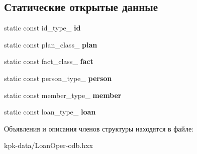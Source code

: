 \subsection*{Статические открытые данные}
\begin{DoxyCompactItemize}
\item 
static const id\+\_\+type\+\_\+ {\bfseries id}\hypertarget{structodb_1_1pointer__query__columns_3_01_1_1kpk_1_1data_1_1_loan_oper_00_01id__pgsql_00_01_a_01_4_a14b2b11bce62adbfae81bbcb9eeeebc2}{}\label{structodb_1_1pointer__query__columns_3_01_1_1kpk_1_1data_1_1_loan_oper_00_01id__pgsql_00_01_a_01_4_a14b2b11bce62adbfae81bbcb9eeeebc2}

\item 
static const plan\+\_\+class\+\_\+ {\bfseries plan}\hypertarget{structodb_1_1pointer__query__columns_3_01_1_1kpk_1_1data_1_1_loan_oper_00_01id__pgsql_00_01_a_01_4_aa7c6cc66c1d8107f30520b266862c297}{}\label{structodb_1_1pointer__query__columns_3_01_1_1kpk_1_1data_1_1_loan_oper_00_01id__pgsql_00_01_a_01_4_aa7c6cc66c1d8107f30520b266862c297}

\item 
static const fact\+\_\+class\+\_\+ {\bfseries fact}\hypertarget{structodb_1_1pointer__query__columns_3_01_1_1kpk_1_1data_1_1_loan_oper_00_01id__pgsql_00_01_a_01_4_a1460627519acc9d1bf23ae6a7fd053e9}{}\label{structodb_1_1pointer__query__columns_3_01_1_1kpk_1_1data_1_1_loan_oper_00_01id__pgsql_00_01_a_01_4_a1460627519acc9d1bf23ae6a7fd053e9}

\item 
static const person\+\_\+type\+\_\+ {\bfseries person}\hypertarget{structodb_1_1pointer__query__columns_3_01_1_1kpk_1_1data_1_1_loan_oper_00_01id__pgsql_00_01_a_01_4_addf9399b85c9c642d928952a74c047b0}{}\label{structodb_1_1pointer__query__columns_3_01_1_1kpk_1_1data_1_1_loan_oper_00_01id__pgsql_00_01_a_01_4_addf9399b85c9c642d928952a74c047b0}

\item 
static const member\+\_\+type\+\_\+ {\bfseries member}\hypertarget{structodb_1_1pointer__query__columns_3_01_1_1kpk_1_1data_1_1_loan_oper_00_01id__pgsql_00_01_a_01_4_a4e73ca1d947e104a4528577419c44777}{}\label{structodb_1_1pointer__query__columns_3_01_1_1kpk_1_1data_1_1_loan_oper_00_01id__pgsql_00_01_a_01_4_a4e73ca1d947e104a4528577419c44777}

\item 
static const loan\+\_\+type\+\_\+ {\bfseries loan}\hypertarget{structodb_1_1pointer__query__columns_3_01_1_1kpk_1_1data_1_1_loan_oper_00_01id__pgsql_00_01_a_01_4_ae5f5e2c2266570c3c6dc5f959ca19cdd}{}\label{structodb_1_1pointer__query__columns_3_01_1_1kpk_1_1data_1_1_loan_oper_00_01id__pgsql_00_01_a_01_4_ae5f5e2c2266570c3c6dc5f959ca19cdd}

\end{DoxyCompactItemize}


Объявления и описания членов структуры находятся в файле\+:\begin{DoxyCompactItemize}
\item 
kpk-\/data/Loan\+Oper-\/odb.\+hxx\end{DoxyCompactItemize}
